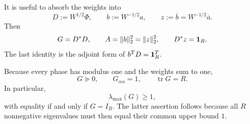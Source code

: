 It is useful to absorb the weights into
\begin{equation}
 D:=W^{1/2}\Phi,
 \qquad
 b:=W^{-1/2}a,
 \qquad
 z:=\overline b=W^{-1/2}\overline a.
 \label{eq:tpc40-weighted-normalization}
\end{equation}
Then
\begin{equation}
 G=D^*D,
 \qquad
 A=\|b\|_2^2=\|z\|_2^2,
 \qquad
 D^*z=\mathbf 1_R.
 \label{eq:tpc40-normalized-recovery-system}
\end{equation}
The last identity is the adjoint form of \(b^TD=\mathbf 1_R^T\).

Because every phase has modulus one and the weights sum to one,
\begin{equation}
 G\succeq0,
 \qquad G_{\alpha\alpha}=1,
 \qquad \operatorname{tr}G=R.
 \label{eq:tpc40-Gram-basic-facts}
\end{equation}
In particular,
\begin{equation}
 \lambda_{\max}(G)\ge1,
 \label{eq:tpc40-Gram-trace-lower-bound}
\end{equation}
with equality if and only if \(G=I_R\).  The latter assertion follows
because all \(R\) nonnegative eigenvalues must then equal their common
upper bound \(1\).
